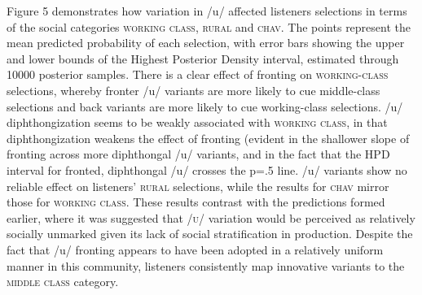 \documentclass[PWPL]{article}
\begin{document}
Figure 5 demonstrates how variation in /u/ affected listeners selections in terms of the social categories \textsc{working class}, \textsc{rural} and \textsc{chav}. The points represent the mean predicted probability of each selection, with error bars showing the upper and lower bounds of the Highest Posterior Density interval, estimated through 10000 posterior samples. There is a clear effect of fronting on \textsc{working-class} selections, whereby fronter /u/ variants are more likely to cue middle-class selections and back variants are more likely to cue working-class selections. /u/ diphthongization seems to be weakly associated with \textsc{working class}, in that diphthongization weakens the effect of fronting (evident in the shallower slope of fronting across more diphthongal /u/ variants, and in the fact that the HPD interval for fronted, diphthongal /u/ crosses the p=.5 line. /u/ variants show no reliable effect on listeners' \textsc{rural} selections, while the results for \textsc{chav} mirror those for \textsc{working class}. 
These results contrast with the predictions formed earlier, where it was suggested that \textsc{/u/} variation would be perceived as relatively socially unmarked given its lack of social stratification in production. Despite the fact that /u/ fronting appears to have been adopted in a relatively uniform manner in this community, listeners consistently map innovative variants to the \textsc{middle class} category. 
\end{document}
